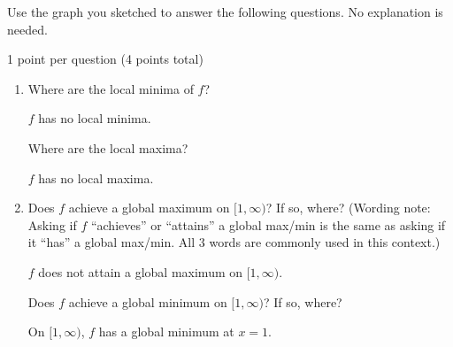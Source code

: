 \documentclass{article}
\begin{document}
\begin{enumerate}
\begin{enumerate}
\begin{enumerate}
    \end{enumerate}
    Use the graph you sketched to answer the following questions. No explanation is needed.

    \begin{grading}
      1 point per question (4 points total)
    \end{grading}

    \begin{enumerate}[resume]
    \item
      \begin{problem}[\vfill]
       Where are the local minima of $f$? 
      \end{problem}

      \begin{solution}
        $f$ has no local minima.
      \end{solution}

      \begin{problem}[\vfill]
        Where are the local maxima?
      \end{problem}

      \begin{solution}
        $f$ has no local maxima.
      \end{solution}

    \item
      \begin{problem}[\vfill]
        Does $f$ achieve a global maximum on $[1, \infty)$? If so, where? (Wording note: Asking if $f$ ``achieves'' or ``attains'' a global max/min is the same as asking if it ``has'' a global max/min. All 3 words are commonly used in this context.) 
      \end{problem}

      \begin{solution}
        $f$ does not attain a global maximum on $[1, \infty)$.
      \end{solution}

      \begin{problem}[\vfill\newpage]
        Does $f$ achieve a global minimum on $[1, \infty)$? If so, where?
      \end{problem}

      \begin{solution}
        On $[1, \infty)$, $f$ has a global minimum at $x=1$. 
      \end{solution}

    \end{enumerate}
  \end{enumerate}


\end{enumerate}
\end{document}
